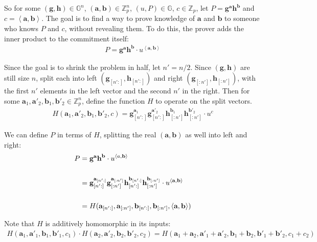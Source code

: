 \documentclass{article}
\begin{document}
So for some $(\textbf{g}, \textbf{h}) \in \mathbb{G}^n$, $(\textbf{a}, \textbf{b}) \in \mathbb{Z}_p^n$, $(u, P) \in \mathbb{G}$, $c \in \mathbb{Z}_p$, let $P = \textbf{g}^\textbf{a} \textbf{h}^\textbf{b}$ and $c = \left<\textbf{a}, \textbf{b}\right>$.  The goal is to find a way to prove knowledge of $\textbf{a}$ and $\textbf{b}$ to someone who knows $P$ and $c$, without revealing them.  To do this, the prover adds the inner product to the commitment itself:
\begin{align}
  P = \textbf{g}^\textbf{a} \textbf{h}^\textbf{b} \cdot u^{\left<\textbf{a}, \textbf{b}\right>}
\end{align}

Since the goal is to shrink the problem in half, let $n' = n/2$.  Since $(\textbf{g}, \textbf{h})$ are still size $n$, split each into left $(\textbf{g}_{[n':]}, \textbf{h}_{[n':]})$ and right $(\textbf{g}_{[:n']}, \textbf{h}_{[:n']})$, with the first $n'$ elements in the left vector and the second $n'$ in the right.  Then for some $\textbf{a}_1, \textbf{a}'_2, \textbf{b}_1, \textbf{b}'_2 \in \mathbb{Z}_p^n$, define the function $H$ to operate on the split vectors. 
\begin{align}
  H(\textbf{a}_1, \textbf{a}'_2, \textbf{b}_1, \textbf{b}'_2, c) = \textbf{g}_{[n':]}^{\textbf{a}_1} \textbf{g}_{[n':]}^{\textbf{a}'_2} \textbf{h}_{[:n']}^{\textbf{b}_1} \textbf{h}_{[:n']}^{\textbf{b}'_2} \cdot u^c
\end{align}

We can define $P$ in terms of $H$, splitting the real $(\textbf{a}, \textbf{b})$ as well into left and right:
\begin{align}
  P &= \textbf{g}^{\textbf{a}} \textbf{h}^{\textbf{b}} \cdot u^{\left<a, \textbf{b}\right>}\\
  \cr &= \textbf{g}_{[n':]}^{\textbf{a}_{[n':]}} \textbf{g}_{[:n']}^{\textbf{a}_{[:n']}} \textbf{h}_{[n':]}^{\textbf{b}_{[n':]}} \textbf{h}_{[:n']}^{\textbf{b}_{[:n']}} \cdot u^{\left<\textbf{a}, \textbf{b}\right>}\\
  \cr &= H(\textbf{a}_{[n':]}, \textbf{a}_{[:n']}, \textbf{b}_{[n':]}, \textbf{b}_{[:n']}, \left<\textbf{a}, \textbf{b}\right>)
\end{align}

Note that $H$ is additively homomorphic in its inputs:
\begin{align}
  H(\textbf{a}_1, \textbf{a}'_1, \textbf{b}_1, \textbf{b}'_1, c_1) \cdot H(\textbf{a}_2, \textbf{a}'_2, \textbf{b}_2, \textbf{b}'_2, c_2) = H(\textbf{a}_1 + \textbf{a}_2, \textbf{a}'_1 + \textbf{a}'_2, \textbf{b}_1 + \textbf{b}_2, \textbf{b}'_1 + \textbf{b}'_2, c_1 + c_2)
\end{align}
\end{document}
